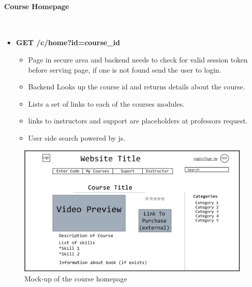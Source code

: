 \documentclass{article}
\begin{document}
\paragraph{Course Homepage}\\
\begin{itemize}
    \item \textbf{GET /c/home?id=course\_id}
        \begin{itemize}
        \item Page in secure area and backend needs to check for valid session
            token before serving page, if one is not found send the user to
                login.
        \item Backend Looks up the course id and returns details about the course.
        \item Lists a set of links to each of the courses modules.
        \item links to instructors and support are placeholders at professors request.
        \item User side search powered by js.
    \end{itemize}
\end{itemize}
\begin{figure}[h!]
    \caption{Mock-up of the course homepage}
    \includegraphics[width=\textwidth]{course_preview}
\end{figure}

\newpage
\end{document}
